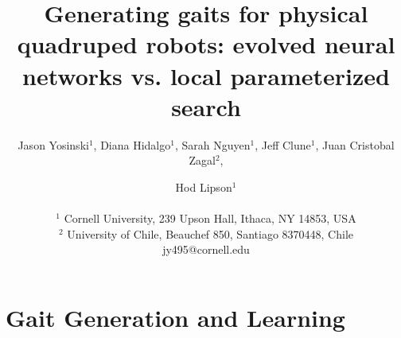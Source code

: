 \documentclass[letterpaper]{article}
\title{Generating gaits for physical quadruped robots: evolved neural networks vs. local parameterized search}
\author {Jason Yosinski$^{1}$,
Diana Hidalgo$^{1}$,
Sarah Nguyen$^{1}$,
Jeff Clune$^{1}$,
Juan Cristobal Zagal$^{2}$,
\and Hod Lipson$^{1}$\\
\mbox{} \\
$^1$ Cornell University, 239 Upson Hall, Ithaca, NY  14853, USA\\
$^2$ University of Chile, Beauchef 850, Santiago 8370448, Chile\\
jy495@cornell.edu}
\begin{document}
\maketitle

\begin{abstract}

\end{abstract}












\section{Gait Generation and Learning}











\footnotesize


\end{document}
